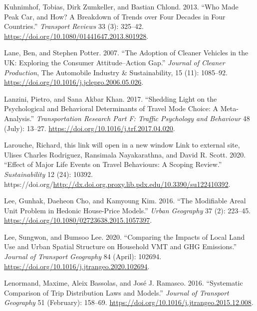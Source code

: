 \documentclass[
  12pt,
]{article}
\newlength{\cslhangindent}
\newlength{\cslentryspacingunit} %
\newenvironment{CSLReferences}[2] %
 {%
  \setlength{\parindent}{0pt}
  \ifodd #1
  \let\oldpar\par
  \def\par{\hangindent=\cslhangindent\oldpar}
  \fi
  \setlength{\parskip}{#2\cslentryspacingunit}
 }%
 {}
\begin{document}
\begin{CSLReferences}{1}{0}
\leavevmode{}%
Kuhnimhof, Tobias, Dirk Zumkeller, and Bastian Chlond. 2013. {``Who {Made Peak Car}, and {How}? {A Breakdown} of {Trends} over {Four Decades} in {Four Countries}.''} \emph{Transport Reviews} 33 (3): 325--42. \url{https://doi.org/10.1080/01441647.2013.801928}.

\leavevmode{}%
Lane, Ben, and Stephen Potter. 2007. {``The Adoption of Cleaner Vehicles in the {UK}: Exploring the Consumer Attitude--Action Gap.''} \emph{Journal of Cleaner Production}, The {Automobile Industry} \& {Sustainability}, 15 (11): 1085--92. \url{https://doi.org/10.1016/j.jclepro.2006.05.026}.

\leavevmode{}%
Lanzini, Pietro, and Sana Akbar Khan. 2017. {``Shedding Light on the Psychological and Behavioral Determinants of Travel Mode Choice: {A} Meta-Analysis.''} \emph{Transportation Research Part F: Traffic Psychology and Behaviour} 48 (July): 13--27. \url{https://doi.org/10.1016/j.trf.2017.04.020}.

\leavevmode{}%
Larouche, Richard, this link will open in a new window Link to external site, Ulises Charles Rodriguez, Ransimala Nayakarathna, and David R. Scott. 2020. {``Effect of {Major Life Events} on {Travel Behaviours}: {A Scoping Review}.''} \emph{Sustainability} 12 (24): 10392. https://doi.org/\url{http://dx.doi.org.proxy.lib.pdx.edu/10.3390/su122410392}.

\leavevmode{}%
Lee, Gunhak, Daeheon Cho, and Kamyoung Kim. 2016. {``The Modifiable Areal Unit Problem in Hedonic House-Price Models.''} \emph{Urban Geography} 37 (2): 223--45. \url{https://doi.org/10.1080/02723638.2015.1057397}.

\leavevmode{}%
Lee, Sungwon, and Bumsoo Lee. 2020. {``Comparing the Impacts of Local Land Use and Urban Spatial Structure on Household {VMT} and {GHG} Emissions.''} \emph{Journal of Transport Geography} 84 (April): 102694. \url{https://doi.org/10.1016/j.jtrangeo.2020.102694}.

\leavevmode{}%
Lenormand, Maxime, Aleix Bassolas, and José J. Ramasco. 2016. {``Systematic Comparison of Trip Distribution Laws and Models.''} \emph{Journal of Transport Geography} 51 (February): 158--69. \url{https://doi.org/10.1016/j.jtrangeo.2015.12.008}.


\end{CSLReferences}
\end{document}
